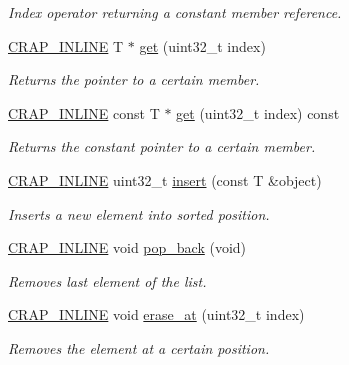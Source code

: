 \begin{DoxyCompactItemize}
\begin{DoxyCompactList}\small\item\em Index operator returning a constant member reference. \end{DoxyCompactList}\item 
\hyperlink{config__x86_8h_a5a40526b8d842e7ff731509998bb0f1c}{C\+R\+A\+P\+\_\+\+I\+N\+L\+I\+N\+E} T $\ast$ \hyperlink{classcrap_1_1list_a1be4e745571c7c0d404b1b2d0d644c2a}{get} (uint32\+\_\+t index)
\begin{DoxyCompactList}\small\item\em Returns the pointer to a certain member. \end{DoxyCompactList}\item 
\hyperlink{config__x86_8h_a5a40526b8d842e7ff731509998bb0f1c}{C\+R\+A\+P\+\_\+\+I\+N\+L\+I\+N\+E} const T $\ast$ \hyperlink{classcrap_1_1list_afa377dc1324654683fc632a2e7e2c0da}{get} (uint32\+\_\+t index) const 
\begin{DoxyCompactList}\small\item\em Returns the constant pointer to a certain member. \end{DoxyCompactList}\item 
\hyperlink{config__x86_8h_a5a40526b8d842e7ff731509998bb0f1c}{C\+R\+A\+P\+\_\+\+I\+N\+L\+I\+N\+E} uint32\+\_\+t \hyperlink{classcrap_1_1list_a55cbabce5d86a596dcf89bddb6dc9997}{insert} (const T \&object)
\begin{DoxyCompactList}\small\item\em Inserts a new element into sorted position. \end{DoxyCompactList}\item 
\hyperlink{config__x86_8h_a5a40526b8d842e7ff731509998bb0f1c}{C\+R\+A\+P\+\_\+\+I\+N\+L\+I\+N\+E} void \hyperlink{classcrap_1_1list_a408fdc946d47cd275392403f2b4a8d20}{pop\+\_\+back} (void)
\begin{DoxyCompactList}\small\item\em Removes last element of the list. \end{DoxyCompactList}\item 
\hyperlink{config__x86_8h_a5a40526b8d842e7ff731509998bb0f1c}{C\+R\+A\+P\+\_\+\+I\+N\+L\+I\+N\+E} void \hyperlink{classcrap_1_1list_af7dd74ffe0e7c02d9d53c08c5a7d3e0f}{erase\+\_\+at} (uint32\+\_\+t index)
\begin{DoxyCompactList}\small\item\em Removes the element at a certain position. \end{DoxyCompactList}\item 

\end{DoxyCompactItemize}

